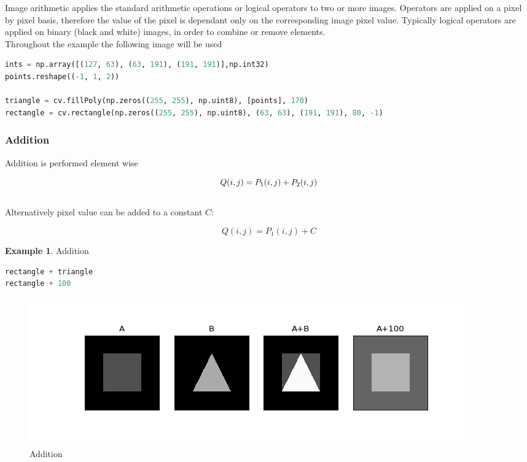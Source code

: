 \documentclass{article}
\theoremstyle{definition}
\newtheorem{ex}{Example}[subsection]
\theoremstyle{remark}
\begin{document}
Image arithmetic applies the standard arithmetic operations or logical operators to two or more images. Operators are applied on a pixel by pixel basis, therefore the value of the pixel is dependant only on the corresponding image pixel value. Typically logical operators are applied on binary (black and white) images, in order to combine or remove elements.\\

\noindent  Throughout the example the following image will be used
\begin{lstlisting}[language=Python]
ints = np.array([(127, 63), (63, 191), (191, 191)],np.int32)
points.reshape((-1, 1, 2))

triangle = cv.fillPoly(np.zeros((255, 255), np.uint8), [points], 170)
rectangle = cv.rectangle(np.zeros((255, 255), np.uint8), (63, 63), (191, 191), 80, -1)
\end{lstlisting}


\subsubsection{Addition}

Addition is performed element wise

\begin{equation}
    Q(i, j) = P_1(i, j) + P_2(i, j)\\
\end{equation}\\

\noindent Alternatively pixel value can be added to a constant $ C $:

\begin{equation*}
    Q(i, j) = P_1(i, j) + C
\end{equation*}

\begin{ex} Addition
\begin{lstlisting}[language=Python]
rectangle + triangle
rectangle + 100
\end{lstlisting}
\begin{figure}[h!]
    \centering
    \includegraphics[width=\textwidth]{ocv_addition}
    \caption{Addition}
    \label{fig:ocv_add}
\end{figure}
\end{ex}
\end{document}
